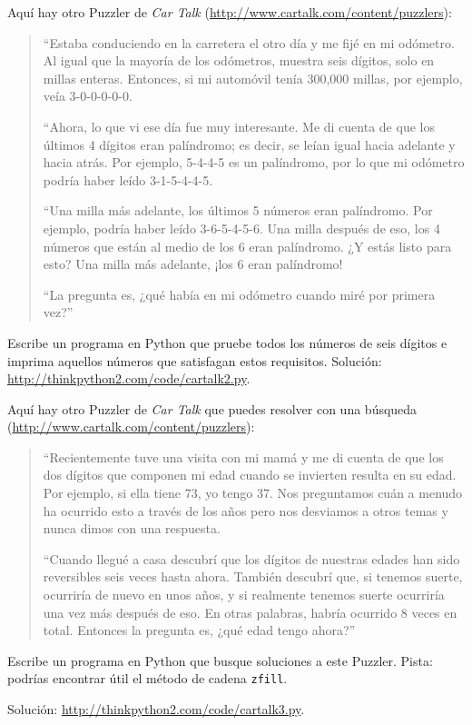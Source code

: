 \documentclass[10pt]{book}
\begin{document}
\begin{exercise}
Aquí hay otro Puzzler de {\em Car Talk}
(\url{http://www.cartalk.com/content/puzzlers}):

\begin{quote}
``Estaba conduciendo en la carretera el otro día y me fijé en
mi odómetro. Al igual que la mayoría de los odómetros, muestra seis dígitos,
solo en millas enteras. Entonces, si mi automóvil tenía 300,000
millas, por ejemplo, veía 3-0-0-0-0-0.

``Ahora, lo que vi ese día fue muy interesante. Me di cuenta de que los
últimos 4 dígitos eran palíndromo; es decir, se leían igual hacia adelante
y hacia atrás. Por ejemplo, 5-4-4-5 es un palíndromo, por lo que mi odómetro
podría haber leído 3-1-5-4-4-5.

``Una milla más adelante, los últimos 5 números eran palíndromo. Por ejemplo,
podría haber leído 3-6-5-4-5-6.  Una milla después de eso, los 4 números que están
al medio de los 6 eran palíndromo.  ¿Y estás listo para esto? Una milla más adelante,
¡los 6 eran palíndromo!

``La pregunta es, ¿qué había en mi odómetro cuando miré por primera vez?''
\end{quote}

Escribe un programa en Python que pruebe todos los números de seis dígitos e imprima
aquellos números que satisfagan estos requisitos.
Solución: \url{http://thinkpython2.com/code/cartalk2.py}.

\end{exercise}


\begin{exercise}
Aquí hay otro Puzzler de {\em Car Talk} que puedes resolver con una
búsqueda (\url{http://www.cartalk.com/content/puzzlers}):

\begin{quote}
``Recientemente tuve una visita con mi mamá y me di cuenta de que
los dos dígitos que componen mi edad cuando se invierten resulta en su
edad. Por ejemplo, si ella tiene 73, yo tengo 37. Nos preguntamos cuán a menudo ha
ocurrido esto a través de los años pero nos desviamos a otros temas y
nunca dimos con una respuesta.

``Cuando llegué a casa descubrí que los dígitos de nuestras edades han sido
reversibles seis veces hasta ahora. También descubrí que, si tenemos suerte,
ocurriría de nuevo en unos años, y si realmente tenemos suerte
ocurriría una vez más después de eso. En otras palabras, habría
ocurrido 8 veces en total. Entonces la pregunta es, ¿qué edad tengo ahora?''

\end{quote}

Escribe un programa en Python que busque soluciones a este Puzzler.
Pista: podrías encontrar útil el método de cadena {\tt zfill}.

Solución: \url{http://thinkpython2.com/code/cartalk3.py}.

\end{exercise}
\end{document}
